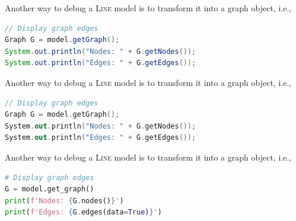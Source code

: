 Another way to debug a \textsc{Line} model is to transform it into a graph object, i.e.,
\begin{JAVA}
\begin{lstlisting}[language=java, basicstyle=\ttfamily\scriptsize]
// Display graph edges
Graph G = model.getGraph();
System.out.println("Nodes: " + G.getNodes());
System.out.println("Edges: " + G.getEdges());
\end{lstlisting}
\end{JAVA}
\begin{KOTLIN}
Another way to debug a \textsc{Line} model is to transform it into a graph object, i.e.,
\begin{lstlisting}[language=kotlin, basicstyle=\ttfamily\scriptsize]
// Display graph edges
Graph G = model.getGraph();
System.out.println("Nodes: " + G.getNodes());
System.out.println("Edges: " + G.getEdges());
\end{lstlisting}
\end{KOTLIN}
\begin{PYTHON}
Another way to debug a \textsc{Line} model is to transform it into a graph object, i.e.,
\begin{lstlisting}[language = python]
# Display graph edges
G = model.get_graph()
print(f'Nodes: {G.nodes()}')
print(f'Edges: {G.edges(data=True)}')
\end{lstlisting}
\end{PYTHON}

